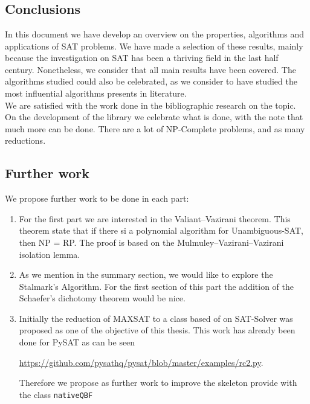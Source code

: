 

\chapter*{}
\section*{Conclusions} 


In this document we have develop an overview on the properties, algorithms and applications of SAT problems. We have made a selection of these results, mainly because the investigation on SAT has been a thriving field in the last half century. Nonetheless, we consider that all main results have been covered. The algorithms studied could also be celebrated, as we consider to have studied the most influential algorithms presents in literature.\\

We are satisfied with the work done in the bibliographic research on the topic. On the development of the library we celebrate what is done, with the note that much more can be done. There are a lot of NP-Complete problems, and as many reductions.


\section*{Further work}

We propose further work to be done in each part:
\begin{enumerate}
\item For the first part we are interested in the Valiant–Vazirani theorem. This theorem state that if there si a polynomial algorithm for Unambiguous-SAT, then NP = RP. The proof is based on the Mulmuley–Vazirani–Vazirani isolation lemma.
\item As we mention in the summary section, we would like to explore the Stalmark's Algorithm. For the first section of this part the addition of the Schaefer's dichotomy theorem would be nice. 
\item Initially the reduction of MAXSAT to a class based of on SAT-Solver was proposed as one of the objective of this thesis. This work has already been done for PySAT as can be seen
  \begin{center}
    \url{https://github.com/pysathq/pysat/blob/master/examples/rc2.py}.
  \end{center}

  Therefore we propose as further work to improve the skeleton provide with the class \texttt{nativeQBF}   
\end{enumerate}